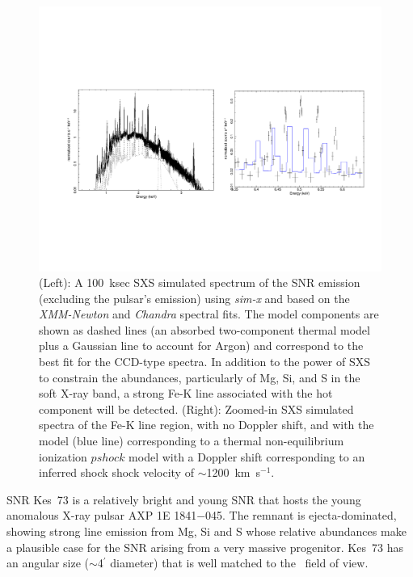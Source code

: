 \documentclass[11pt,a4paper]{article}
\begin{document}
{\begin{figure}
 \begin{center}
 
\includegraphics[width=1.0\textwidth, height=0.35\textheight]{kes73_SXSspec_merged.pdf}
\caption{(Left): A 100~ksec SXS simulated spectrum of the SNR emission
  (excluding the pulsar's emission) using \textit{sim-x} and based on the
  \textit{XMM-Newton} and \textit{Chandra} spectral fits.  The model
  components are shown as dashed lines (an absorbed two-component
  thermal model plus a Gaussian line to account for Argon) and
  correspond to the best fit for the CCD-type spectra.  In addition to
  the power of SXS to constrain the abundances, particularly of Mg,
  Si, and S in the soft X-ray band, a strong Fe-K line associated with
  the hot component will be detected.  (Right): Zoomed-in SXS
  simulated spectra of the Fe-K line region, with no Doppler shift,
  and with the model (blue line)
  corresponding to a thermal non-equilibrium ionization $pshock$ model
  with a Doppler shift corresponding to an inferred shock shock velocity of
  $\sim$1200~km~s$^{-1}$.}
\label{fig:kes73sxs}
\end{center}
\end{figure}


SNR Kes~73 is a relatively bright and young SNR that hosts the young
anomalous X-ray pulsar AXP 1E 1841$-$045.  The remnant is
ejecta-dominated, showing strong line emission from Mg, Si and S
whose relative abundances make a plausible
case for the SNR arising from a very massive progenitor.  Kes~73
has an angular size ($\sim$4$^\prime$ diameter) that is well matched
to the \ah\ field of view. 

}
\end{document}
